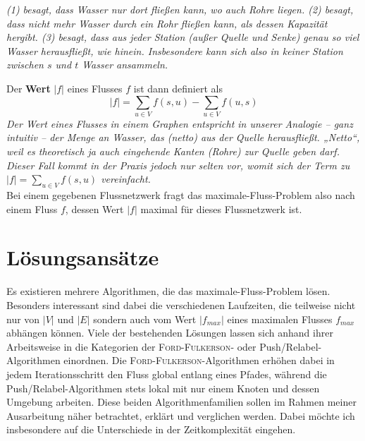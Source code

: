 \documentclass[journal]{IEEEtran}
\newcommand{\ff}{\textsc{Ford-Fulkerson}}
\newcommand{\pr}{Push/Relabel}
\begin{document}
\textit{
(1) besagt, dass Wasser nur dort fließen kann, wo auch Rohre liegen.
(2) besagt, dass nicht mehr Wasser durch ein Rohr fließen kann, als dessen Kapazität hergibt.
(3) besagt, dass aus jeder Station (außer Quelle und Senke) genau so viel Wasser herausfließt, wie hinein. Insbesondere kann sich also in keiner Station zwischen $s$ und $t$ Wasser ansammeln.}

\medskip Der \textbf{Wert} $\lvert f \rvert$ eines Flusses $f$ ist dann definiert als
\begin{equation}
\lvert f \rvert = \sum_{u\in V} f(s,u) - \sum_{u\in V} f(u,s)
\end{equation}
\textit{Der Wert eines Flusses in einem Graphen entspricht in unserer Analogie – ganz intuitiv – der Menge an Wasser, das (netto) aus der Quelle herausfließt. „Netto“, weil es theoretisch ja auch eingehende Kanten (Rohre) zur Quelle geben darf. Dieser Fall kommt in der Praxis jedoch nur selten vor, womit sich der Term zu $\lvert f \rvert = \sum_{u\in V} f(s,u)$ vereinfacht.}\\
Bei einem gegebenen Flussnetzwerk fragt das maximale-Fluss-Problem also nach einem Fluss $f$, dessen  Wert $\lvert f \rvert$ maximal für dieses Flussnetzwerk ist. 

\section{Lösungsansätze}
Es existieren mehrere Algorithmen, die das maximale-Fluss-Problem lösen. Besonders interessant sind dabei die verschiedenen Laufzeiten, die teilweise nicht nur von $\lvert V \rvert$ und $\lvert E \rvert$ sondern auch vom Wert $\lvert f_{max} \rvert$ eines maximalen Flusses $f_{max}$ abhängen können.
Viele der bestehenden Lösungen lassen sich anhand ihrer Arbeitsweise in die Kategorien der \ff - oder \pr -Algorithmen einordnen.
Die \ff -Algorithmen erhöhen dabei in jedem Iterationsschritt den Fluss global entlang eines Pfades, während die \pr -Algorithmen stets lokal mit nur einem Knoten und dessen Umgebung arbeiten. Diese beiden Algorithmenfamilien sollen im Rahmen meiner Ausarbeitung näher betrachtet, erklärt und verglichen werden. Dabei möchte ich insbesondere auf die Unterschiede in der Zeitkomplexität eingehen.

{}


	
\end{document}
